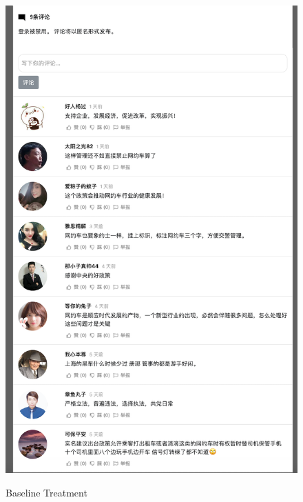 \documentclass[11pt]{article}
\begin{document}
\begin{figure}
  \centering
  \caption{Baseline Treatment}
  \vspace{1em}
  \includegraphics[height=.9\textheight]{figures/baseline.png}
  \label{baseline}
\end{figure}
\end{document}
